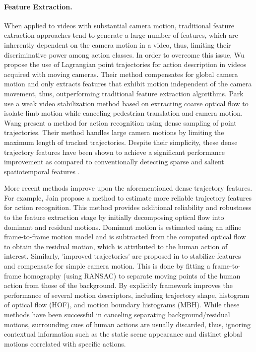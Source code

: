 \paragraph{\textbf{Feature Extraction.}} When applied to videos with substantial camera motion, traditional feature extraction approaches  tend to generate a large number of features, which are inherently dependent on the camera motion in a video, thus, limiting their discriminative power among action classes. In order to overcome this issue, Wu \etal \cite{wu2011} propose the use of Lagrangian point trajectories for action description in videos acquired with moving cameras. Their method compensates for global camera motion and only extracts features that exhibit motion independent of the camera movement, thus, outperforming traditional feature extraction algorithms. Park \etal \cite{park2013} use a weak video stabilization method based on extracting coarse optical flow to isolate limb motion while canceling pedestrian translation and camera motion. Wang \etal \cite{wang2011} present a method for action recognition using dense sampling of point trajectories. Their method handles large camera motions by limiting the maximum length of tracked trajectories. Despite their simplicity, these dense trajectory features have been shown to achieve a significant performance improvement as compared to conventionally detecting sparse and salient spatiotemporal features \cite{laptev2005}.

More recent methods improve upon the aforementioned dense trajectory features. For example, Jain \etal \cite{jain2013} propose a method to estimate more reliable trajectory features for action recognition. This method provides additional reliability and robustness to the feature extraction stage by initially decomposing optical flow into dominant and residual motions. Dominant motion is estimated using an affine frame-to-frame motion model and is subtracted from the computed optical flow to obtain the residual motion, which is attributed to the human action of interest. Similarly, 'improved trajectories' are proposed in \cite{wang2013} to stabilize features and compensate for simple camera motion. This is done by fitting a frame-to-frame homography (using RANSAC) to separate moving points of the human action from those of the background. By explicitly   framework improves the performance of several motion descriptors, including trajectory shape, histogram of optical flow (HOF), and motion boundary histograms (MBH). While these methods have been successful in canceling separating  background/residual motions, surrounding cues of human actions are usually discarded, thus, ignoring contextual information such as the static scene appearance and distinct global motions correlated with specific actions.

